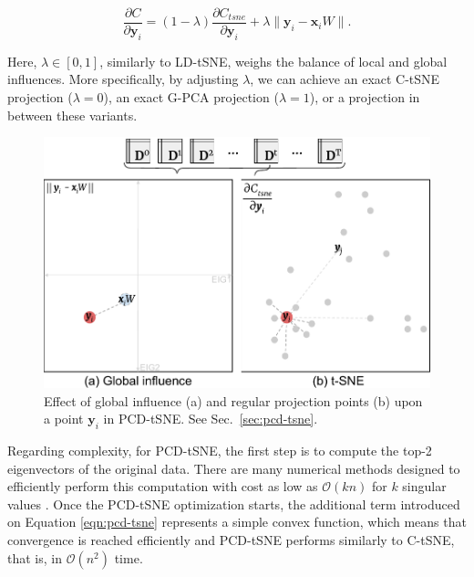\begin{equation}
\label{eqn:pcd-tsne}
\frac{\partial C}{\partial \mathbf{y}_{i}} = (1-\lambda) \frac{\partial C_{tsne}}{\partial \mathbf{y}_{i}} + \lambda \|\mathbf{y}_i - \mathbf{x}_i W \|.
\end{equation}

%
Here, $\lambda \in [0,1]$, similarly to LD-tSNE, weighs the balance of local and global influences. More specifically, by adjusting $\lambda$, we can achieve an exact C-tSNE projection ($\lambda=0$), an exact G-PCA projection ($\lambda=1$), or a projection in between these variants.


\begin{figure}[h]\centering
  \includegraphics[width=\linewidth]{figures/projection-algorithm/pcdtsne.pdf}
  \caption{Effect of global influence (a) and regular projection points (b) upon a point $\mathbf{y}_i$ in PCD-tSNE. See Sec.~\ref{sec:pcd-tsne}.}
  \label{fig:pcdtsne}
\end{figure}

Regarding complexity, for PCD-tSNE, the first step is to compute the top-2 eigenvectors of the original data. There are many numerical methods designed to efficiently perform this computation  with cost as low as $\mathcal{O}(kn)$ for $k$ singular values \cite{svd-complexity,cline2006computatio}.
Once the PCD-tSNE optimization starts, the additional term introduced on Equation \ref{eqn:pcd-tsne} represents a simple convex function, which means that convergence is reached efficiently and PCD-tSNE performs similarly to C-tSNE, that is, in $\mathcal{O}(n^2)$ time.


